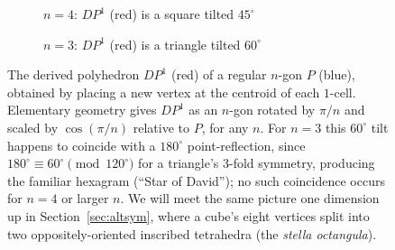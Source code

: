 \documentclass{amsart}
\theoremstyle{plain}
\theoremstyle{definition}
\begin{document}
\begin{figure}[h]
    \centering
    \begin{subfigure}{.49\linewidth}
        \centering
        \caption{$n=4$: $DP^1$ (red) is a square tilted $45^\circ$}
    \end{subfigure}
    \begin{subfigure}{.49\linewidth}
        \centering
        \caption{$n=3$: $DP^1$ (red) is a triangle tilted $60^\circ$}
    \end{subfigure}
    \caption{The derived polyhedron $DP^1$ (red) of a regular $n$-gon $P$ (blue), obtained by placing a new vertex at the centroid of each $1$-cell. Elementary geometry gives $DP^1$ as an $n$-gon rotated by $\pi/n$ and scaled by $\cos(\pi/n)$ relative to $P$, for any $n$. For $n=3$ this $60^\circ$ tilt happens to coincide with a $180^\circ$ point-reflection, since $180^\circ\equiv 60^\circ\pmod{120^\circ}$ for a triangle's $3$-fold symmetry, producing the familiar hexagram (``Star of David''); no such coincidence occurs for $n=4$ or larger $n$. We will meet the same picture one dimension up in Section~\ref{sec:altsym}, where a cube's eight vertices split into two oppositely-oriented inscribed tetrahedra (the \emph{stella octangula}).}
    \label{fig:dp1-2d}
\end{figure}
\end{document}
